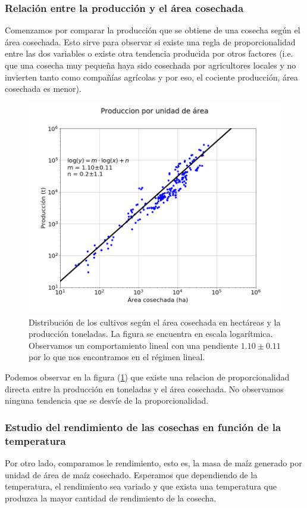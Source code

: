 \documentclass[12pt, spanish]{article}
\begin{document}
\subsubsection{Relación entre la producción y el área cosechada}

Comenzamos por comparar la producción que se obtiene de una cosecha según el área cosechada. Esto sirve para observar si existe una regla de proporcionalidad entre las dos variables o existe otra tendencia producida por otros factores (i.e. que una cosecha muy pequeña haya sido cosechada por agricultores locales y no invierten tanto como compañías agrícolas y por eso, el cociente producción, área cosechada es menor).

\begin{figure}[H]
	\includegraphics[width=0.6\linewidth]{./figures/cosecha.png} %
	\caption{Distribución de los cultivos según el área cosechada en hectáreas y la producción toneladas. La figura se encuentra en escala logarítmica. Observamos un comportamiento lineal con una pendiente $1.10 \pm 0.11$ por lo que nos encontramos en el régimen lineal.}
	\label{fig:cosecha}
\end{figure}

Podemos observar en la figura (\ref{fig:cosecha}) que existe una relacion de proporcionalidad directa entre la producción en toneladas y el área cosechada. No observamos ninguna tendencia que se desvíe de la proporcionalidad.

\subsubsection{Estudio del rendimiento de las cosechas en función de la temperatura}


Por otro lado, comparamos le rendimiento, esto es, la masa de maíz generado por unidad de área de maíz cosechado. Esperamos que dependiendo de la temperatura, el rendimiento sea variado y que exista una temperatura que produzca la mayor cantidad de rendimiento de la cosecha.
\end{document}
